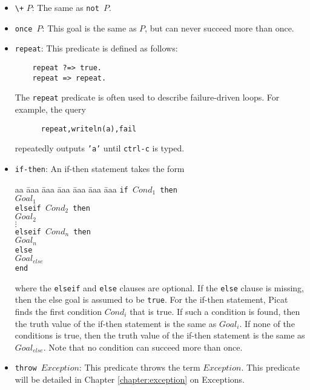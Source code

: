 \begin{itemize}
\item \verb-\+- \texttt{$P$}: The same as \texttt{not $P$}.
\item \texttt{once $P$}: This goal is the same as $P$, but can never succeed more than once.
\item \texttt{repeat}: This predicate is defined as follows:
\begin{verbatim}
    repeat ?=> true.
    repeat => repeat.
\end{verbatim}
The \texttt{repeat} predicate is often used to describe failure-driven loops. For example, the query 
\begin{verbatim}
      repeat,writeln(a),fail
\end{verbatim} 
repeatedly outputs \texttt{'a'} until \texttt{ctrl-c} is typed.
\item \texttt{if-then}: An if-then statement takes the form 
\begin{tabbing}
aa \= aaa \= aaa \= aaa \= aaa \= aaa \= aaa \kill
\> \texttt{if $Cond_1$ then} \\
\> \> $Goal_1$ \\
\> \texttt{elseif $Cond_2$ then} \\
\> \> $Goal_2$ \\
\> \> $\vdots$ \\
\> \texttt{elseif $Cond_{n}$ then} \\
\> \> $Goal_{n}$ \\
\> \texttt{else} \\
\> \> $Goal_{else}$ \\
\> \texttt{end}
\end{tabbing}
where the \texttt{elseif} and \texttt{else} clauses are optional. If the \texttt{else} clause is missing, then the else goal is assumed to be \texttt{true}. For the if-then statement, Picat finds the first condition $Cond_i$ that is true. If such a condition is found, then the truth value of the if-then statement is the same as $Goal_i$. If none of the conditions is true, then the truth value of the if-then statement is the same as $Goal_{else}$. Note that no condition can succeed more than once. 
\item \texttt{throw $Exception$}: This predicate throws the term $Exception$. This predicate will be detailed in Chapter \ref{chapter:exception} on Exceptions.


\end{itemize}
